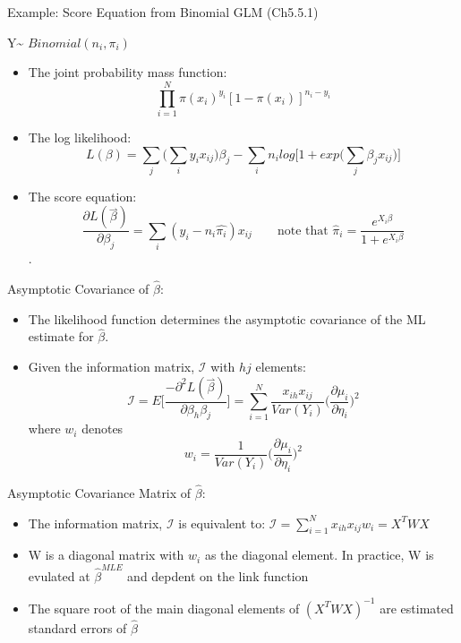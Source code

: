 \documentclass[ignorenonframetext,]{beamer}
\providecommand{\tightlist}{%
  \setlength{\itemsep}{0pt}\setlength{\parskip}{0pt}}
\begin{document}
\begin{frame}{Example: Score Equation from Binomial GLM (Ch5.5.1)}

Y\textasciitilde{} \(Binomial (n_i, \pi_i)\)

\begin{itemize}
\tightlist
\item
  The joint probability mass function: \[
  \prod_{i=1}^N \pi(x_i)^{y_i}[1-\pi(x_i)]^{n_i-y_i}
  \]
\item
  The log likelihood:
  \[L(\beta) = \sum_j\Big(\sum_iy_ix_{ij}\Big)\beta_j-\sum_in_ilog\Big[1+ exp \Big(\sum_j\beta_jx_{ij}\Big)\Big]
  \]
\item
  The score equation:
  \[\frac{\partial L(\overset{\rightharpoonup}{\beta})}{\partial \beta_j} = \sum_i (y_i - n_i\hat{\pi_i})x_{ij} \qquad \text{note that  }\hat\pi_i = \frac{e^{X_i\beta}}{1 + e^{X_i\beta}}\].
\end{itemize}

\end{frame}

\begin{frame}{Asymptotic Covariance of \(\hat\beta\):}

\begin{itemize}
\item
  The likelihood function determines the asymptotic covariance of the ML
  estimate for \(\hat\beta\).
\item
  Given the information matrix, \(\mathcal{I}\) with \(hj\) elements:
  \[ \mathcal{I} = E\Big[\frac{-\partial^2 L(\overset{\rightharpoonup}{\beta})}{\partial \beta_h \beta_j} \Big] = \sum_{i = 1}^N \frac{x_{ih}x_{ij}}{Var(Y_i)} \Big(\frac{\partial \mu_i}{\partial \eta_i} \Big)^2\]
  where \(w_i\) denotes
  \[w_i = \frac{1}{Var(Y_i)} \Big(\frac{\partial \mu_i}{\partial \eta_i} \Big)^2\]
\end{itemize}

\end{frame}

\begin{frame}{Asymptotic Covariance Matrix of \(\hat\beta\):}

\begin{itemize}
\tightlist
\item
  The information matrix, \(\mathcal{I}\) is equivalent to:
  \(\mathcal{I} = \sum_{i=1}^N x_{ih}x_{ij}w_i = X^TWX\)
\item
  W is a diagonal matrix with \(w_i\) as the diagonal element. In
  practice, W is evulated at \(\hat{\beta}^{MLE}\) and depdent on the
  link function
\item
  The square root of the main diagonal elements of \((X^TWX)^{-1}\) are
  estimated standard errors of \(\hat{\beta}\)
\end{itemize}

\end{frame}
\end{document}
